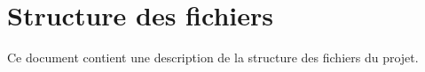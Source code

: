 \chapter{Structure des fichiers}
\hypertarget{index}{}\label{index}
Ce document contient une description de la structure des fichiers du projet.

 